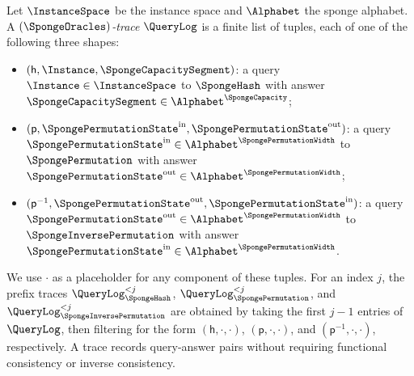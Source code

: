 \begin{definition}
\label{def:dsfs_query_answer_trace}
\leanok
{}
Let \(\InstanceSpace\) be the instance space and \(\Alphabet\) the sponge alphabet. A \emph{\((\SpongeOracles)\)-trace} \(\QueryLog\) is a finite list of tuples, each of one of the following three shapes:
\begin{itemize}
\item \((\mathsf{h}, \Instance, \SpongeCapacitySegment)\): a query \(\Instance \in \InstanceSpace\) to \(\SpongeHash\) with answer \(\SpongeCapacitySegment \in \Alphabet^{\SpongeCapacity}\);
\item \((\mathsf{p}, \SpongePermutationState^{\mathrm{in}}, \SpongePermutationState^{\mathrm{out}})\): a query \(\SpongePermutationState^{\mathrm{in}} \in \Alphabet^{\SpongePermutationWidth}\) to \(\SpongePermutation\) with answer \(\SpongePermutationState^{\mathrm{out}} \in \Alphabet^{\SpongePermutationWidth}\);
\item \((\mathsf{p}^{-1}, \SpongePermutationState^{\mathrm{out}}, \SpongePermutationState^{\mathrm{in}})\): a query \(\SpongePermutationState^{\mathrm{out}} \in \Alphabet^{\SpongePermutationWidth}\) to \(\SpongeInversePermutation\) with answer \(\SpongePermutationState^{\mathrm{in}} \in \Alphabet^{\SpongePermutationWidth}\).
\end{itemize}
We use \(\cdot\) as a placeholder for any component of these tuples. For an index \(j\), the prefix traces \(\QueryLog_{\SpongeHash}^{<j}\), \(\QueryLog_{\SpongePermutation}^{<j}\), and \(\QueryLog_{\SpongeInversePermutation}^{<j}\) are obtained by taking the first \(j-1\) entries of \(\QueryLog\), then filtering for the form \((\mathsf{h},\cdot,\cdot)\), \((\mathsf{p},\cdot,\cdot)\), and \((\mathsf{p}^{-1},\cdot,\cdot)\), respectively. A trace records query-answer pairs without requiring functional consistency or inverse consistency.
\end{definition}


